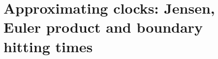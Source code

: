 \chapter{Approximating clocks: Jensen, Euler product and boundary hitting times}\label{vol2:ch20}



